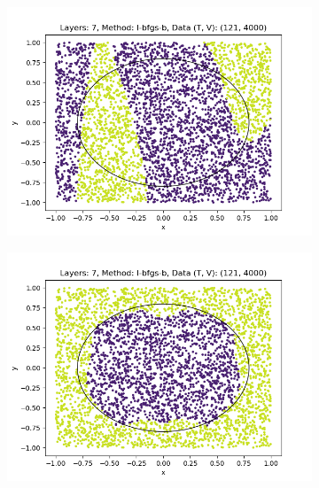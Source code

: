 \begin{figure}[h]
\begin{subfigure}[b]{0.45\textwidth}
        \includegraphics[width=\textwidth]{sections/chapters/Quantum-Machine-Learning/Images/Data-Re-Uploading/Layer7-B.png}
    \end{subfigure}
    \begin{subfigure}[b]{0.45\textwidth}
        \centering
        \includegraphics[width=\textwidth]{sections/chapters/Quantum-Machine-Learning/Images/Data-Re-Uploading/Layer7-A.png}
    \end{subfigure}
    \begin{subfigure}[b]{0.45\textwidth}
        \centering

\end{subfigure}
\end{figure}
